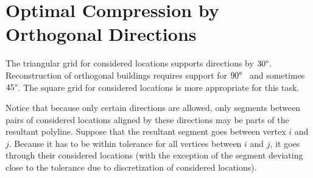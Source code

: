 \documentclass[conference]{IEEEtran}
\begin{document}
\section{Optimal Compression by Orthogonal Directions}

The triangular grid for considered locations supports directions by $30 \degree$. Reconstruction of orthogonal buildings requires support for $90 \degree$~\cite{ReconstructionOfOrthogonalPolygonalLines} and sometimes $45 \degree$. The square grid for considered locations is more appropriate for this task.

Notice that because only certain directions are allowed, only segments between pairs of considered locations aligned by these directions may be parts of the resultant polyline. Suppose that the resultant segment goes between vertex $i$ and $j$. Because it has to be within tolerance for all vertices between $i$ and $j$, it goes through their considered locations (with the exception of the segment deviating close to the tolerance due to discretization of considered locations).
\end{document}
